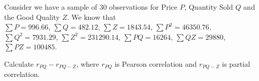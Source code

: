 
\begin{question}
Consider we have a sample of 30 observations for Price \(P\), Quantity Sold \(Q\) and the Good Quality \(Z\).
We know that\\
\(\sum{P} = 996.66\),
\(\sum{Q} = 482.12\),
\(\sum{Z} = 1843.54\),
\(\sum{P^2} = 46350.76\),
\(\sum{Q^2} = 7931.29\),
\(\sum{Z^2} = 231290.14\),
\(\sum{PQ} = 16264\),
\(\sum{QZ} = 29880\),
\(\sum{PZ} = 100485\).

Calculate \(r_{PQ} - r_{PQ-Z}\), where \(r_{PQ}\) is Pearson correlation and \(r_{PQ-Z}\) is partial correlation.
\end{question}


